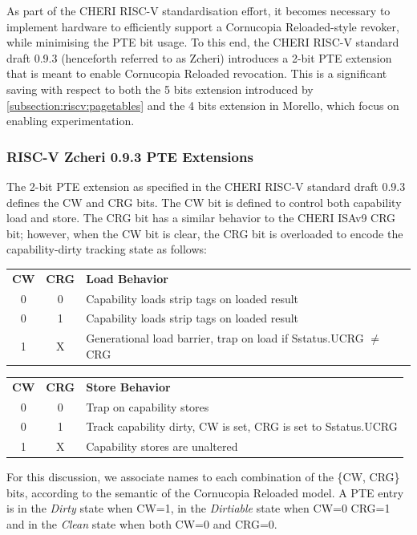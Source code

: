 As part of the CHERI RISC-V standardisation effort, it becomes necessary to
implement hardware to efficiently support a Cornucopia Reloaded-style revoker,
while minimising the PTE bit usage. To this end, the CHERI RISC-V standard draft
0.9.3 \cite{riscv-cheri-draft-0-9-3} (henceforth referred to as Zcheri)
introduces a 2-bit PTE extension that is meant to enable Cornucopia Reloaded
revocation.
This is a significant saving with respect to both the 5 bits extension introduced by
\cref{subsection:riscv:pagetables} and the 4 bits extension in Morello,
which focus on enabling experimentation.

\subsubsection{RISC-V Zcheri 0.9.3 PTE Extensions}
The 2-bit PTE extension as specified in the CHERI RISC-V standard draft 0.9.3
defines the CW and CRG bits. The CW bit is defined to control both capability
load and store. The CRG bit has a similar behavior to the CHERI ISAv9 CRG bit;
however, when the CW bit is clear, the CRG bit is overloaded to encode the
capability-dirty tracking state as follows:

\begin{center}
  \begin{tabular}{ccl}
    \textbf{CW} & \textbf{CRG} & \textbf{Load Behavior} \\
    0 & 0 & Capability loads strip tags on loaded result \\
    0 & 1 & Capability loads strip tags on loaded result \\
    1 & X & Generational load barrier, trap on load if Sstatus.UCRG $\neq$ CRG \\
  \end{tabular}
  \begin{tabular}{ccl}
    \textbf{CW} & \textbf{CRG} & \textbf{Store Behavior} \\
    0 & 0 & Trap on capability stores \\
    0 & 1 & Track capability dirty, CW is set, CRG is set to Sstatus.UCRG \\
    1 & X & Capability stores are unaltered \\
  \end{tabular}
\end{center}

For this discussion, we associate names to each combination of the \{CW, CRG\}
bits, according to the semantic of the Cornucopia Reloaded model.
A PTE entry is in the \textit{Dirty} state when CW=1, in the
\textit{Dirtiable} state when CW=0 CRG=1 and in the \textit{Clean} state when
both CW=0 and CRG=0.

